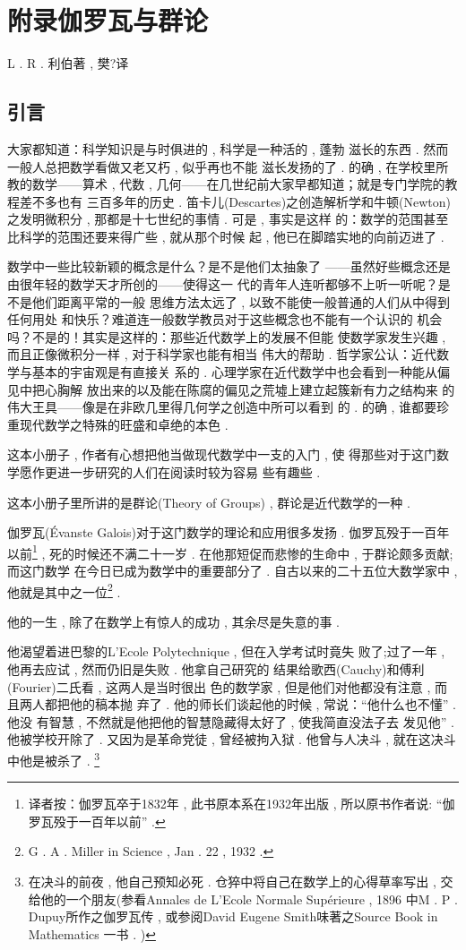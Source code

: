 \chapter{附录伽罗瓦与群论}
\begin{center}
	L . R . 利伯著 , 樊?译
\end{center}

\section{引言}

大家都知道：科学知识是与时俱进的 , 科学是一种活的 , 蓬勃 滋长的东西 . 然而一般人总把数学看做又老又朽 , 似乎再也不能 滋长发扬的了 . 的确 , 在学校里所教的数学——算术 , 代数 , 几何——在几世纪前大家早都知道；就是专门学院的教程差不多也有 三百多年的历史 . 笛卡儿(Descartes)之创造解析学和牛顿(Newton)之发明微积分 , 那都是十七世纪的事情 . 可是 , 事实是这样 的：数学的范围甚至比科学的范围还要来得广些 , 就从那个时候 起 , 他已在脚踏实地的向前迈进了 . 

数学中一些比较新颖的概念是什么？是不是他们太抽象了 ——虽然好些概念还是由很年轻的数学天才所创的——使得这一 代的青年人连听都够不上听一听呢？是不是他们距离平常的一般 思维方法太远了 , 以致不能使一般普通的人们从中得到任何用处 和快乐？难道连一般数学教员对于这些概念也不能有一个认识的 机会吗？不是的！其实是这样的：那些近代数学上的发展不但能 使数学家发生兴趣 , 而且正像微积分一样 , 对于科学家也能有相当 伟大的帮助 . 哲学家公认：近代数学与基本的宇宙观是有直接关 系的 . 心理学家在近代数学中也会看到一种能从偏见中把心胸解 放出来的以及能在陈腐的偏见之荒墟上建立起簇新有力之结构来 的伟大王具——像是在非欧几里得几何学之创造中所可以看到 的 . 的确 , 谁都要珍重现代数学之特殊的旺盛和卓绝的本色 . 

这本小册子 , 作者有心想把他当做现代数学中一支的入门 , 使 得那些对于这门数学愿作更进一步研究的人们在阅读时较为容易 些有趣些 . 

这本小册子里所讲的是群论(Theory of Groups) , 群论是近代数学的一种 . 

伽罗瓦(Évanste Galois)对于这门数学的理论和应用很多发扬 . 伽罗瓦殁于一百年以前\footnote{译者按：伽罗瓦卒于1832年 , 此书原本系在1932年出版 , 所以原书作者说: “伽罗瓦殁于一百年以前” . } , 死的时候还不满二十一岁 . 在他那短促而悲惨的生命中 , 于群论颇多贡献;而这门数学 在今日已成为数学中的重要部分了 . 自古以来的二十五位大数学家中 , 他就是其中之一位\footnote{G . A . Miller in Science , Jan . 22 , 1932 . } . 

他的一生 , 除了在数学上有惊人的成功 , 其余尽是失意的事 . 

他渴望着进巴黎的L'Ecole Polytechnique , 但在入学考试时竟失 败了;过了一年 , 他再去应试 , 然而仍旧是失败 . 他拿自己研究的 结果给歌西(Cauchy)和傅利(Fourier)二氏看 , 这两人是当时很出 色的数学家 , 但是他们对他都没有注意 , 而且两人都把他的稿本抛 弃了 . 他的师长们谈起他的时候 , 常说：“他什么也不懂” . 他没 有智慧 , 不然就是他把他的智慧隐藏得太好了 , 使我简直没法子去 发见他” . 他被学校开除了 . 又因为是革命党徒 , 曾经被拘入狱 .  他曾与人决斗 , 就在这决斗中他是被杀了 . \footnote{在决斗的前夜 , 他自己预知必死 . 仓猝中将自己在数学上的心得草率写出 , 交给他的一个朋友(参看Annales de L'Ecole Normale Supérieure ,  1896 中M . P .  Dupuy所作之伽罗瓦传 , 或参阅David Eugene Smith味著之Source Book in Mathematics 一书 . )}

